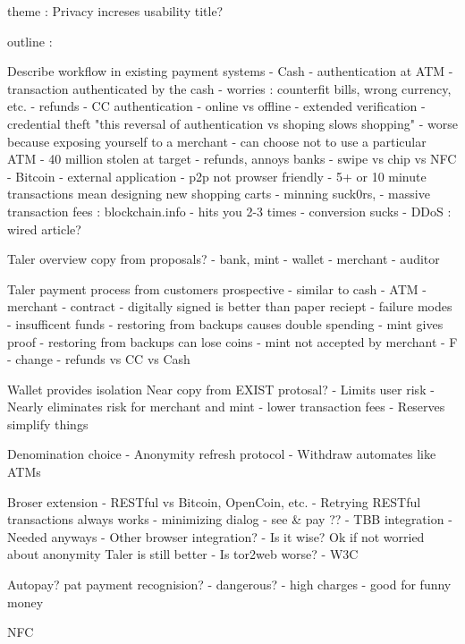 \documentclass[letterpaper,12pt]{article}
\begin{document}
theme : Privacy increses usability
title?

outline : 


Describe workflow in existing payment systems
- Cash
  - authentication at ATM
  - transaction authenticated by the cash
  - worries : counterfit bills, wrong currency, etc.
  - refunds
- CC authentication 
  - online vs offline
  - extended verification
  - credential theft
  "this reversal of authentication vs shoping slows shopping"
    - worse because exposing yourself to a merchant
    - can choose not to use a particular ATM
    - 40 million stolen at target
  - refunds, annoys banks
  - swipe vs chip vs NFC
- Bitcoin
  - external application
    - p2p not prowser friendly
  - 5+ or 10 minute transactions mean designing new shopping carts
  - minning suck0rs, 
    - massive transaction fees : blockchain.info 
      - hits you 2-3 times
  - conversion sucks
  - DDoS : wired article?


Taler overview
  copy from proposals?
- bank, mint
- wallet
- merchant
- auditor

Taler payment process from customers prospective
- similar to cash 
  - ATM
  - merchant
- contract 
  - digitally signed is better than paper reciept
- failure modes
  - insufficent funds
  - restoring from backups causes double spending
    - mint gives proof
  - restoring from backups can lose coins
  - mint not accepted by merchant
    - F
- change
- refunds
  vs CC
  vs Cash


Wallet provides isolation
  Near copy from EXIST protosal?
- Limits user risk
- Nearly eliminates risk for merchant and mint
  - lower transaction fees
- Reserves simplify things 

Denomination choice
- Anonymity refresh protocol
- Withdraw automates like ATMs

Broser extension
- RESTful vs Bitcoin, OpenCoin, etc.
  - Retrying RESTful transactions always works
- minimizing dialog
- see & pay ??
- TBB integration
  - Needed anyways
- Other browser integration?
  - Is it wise?  Ok if not worried about anonymity  Taler is still better
  - Is tor2web worse? 
- W3C

Autopay?  pat payment recognision?
- dangerous?
- high charges
- good for funny money

NFC
\end{document}
